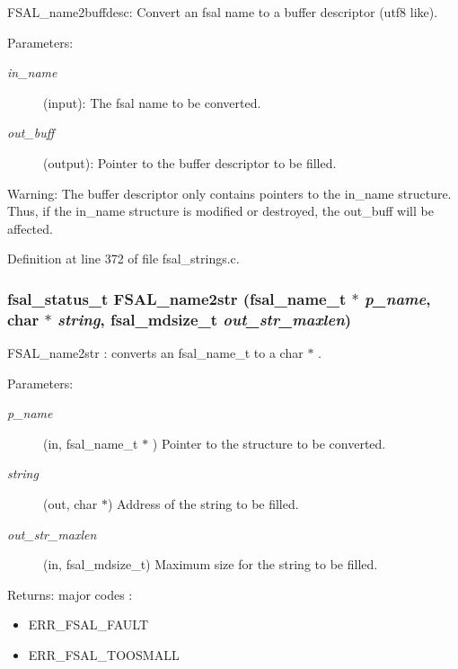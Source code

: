 FSAL\_\-name2buffdesc: Convert an fsal name to a buffer descriptor (utf8 like).

\begin{Desc}
\item[Parameters:]
\begin{description}
\item[{\em in\_\-name}](input): The fsal name to be converted. \item[{\em out\_\-buff}](output): Pointer to the buffer descriptor to be filled.\end{description}
\end{Desc}
\begin{Desc}
\item[Warning:]The buffer descriptor only contains pointers to the in\_\-name structure. Thus, if the in\_\-name structure is modified or destroyed, the out\_\-buff will be affected. \end{Desc}


Definition at line 372 of file fsal\_\-strings.c.
\subsubsection{\setlength{\rightskip}{0pt plus 5cm}fsal\_\-status\_\-t FSAL\_\-name2str (fsal\_\-name\_\-t $\ast$ {\em p\_\-name}, char $\ast$ {\em string}, fsal\_\-mdsize\_\-t {\em out\_\-str\_\-maxlen})}\label{group__FSALNameFunctions_ga2}


FSAL\_\-name2str : converts an fsal\_\-name\_\-t to a char $\ast$ .

\begin{Desc}
\item[Parameters:]
\begin{description}
\item[{\em p\_\-name}](in, fsal\_\-name\_\-t $\ast$ ) Pointer to the structure to be converted. \item[{\em string}](out, char $\ast$) Address of the string to be filled. \item[{\em out\_\-str\_\-maxlen}](in, fsal\_\-mdsize\_\-t) Maximum size for the string to be filled.\end{description}
\end{Desc}
\begin{Desc}
\item[Returns:]major codes :\begin{itemize}
\item ERR\_\-FSAL\_\-FAULT\item ERR\_\-FSAL\_\-TOOSMALL \end{itemize}
\end{Desc}



